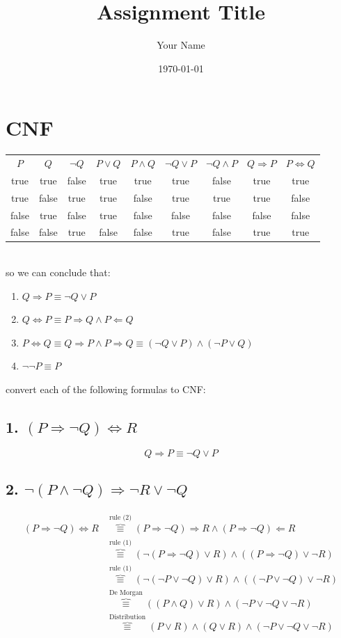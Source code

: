 \documentclass{article}
\title{Assignment Title}
\author{Your Name}
\date{\today}
\begin{document}
\maketitle

\section{CNF}
\begin{tabular}{ccccccccc}
    $P$ & $Q$  & $\neg Q$ & $P \lor Q$ & $P \land Q$ & $\neg Q \lor P$ & $\neg Q \land P$ & $Q \Rightarrow P$ & $P \iff Q$\\
    true&true&false&true&true&true&false&true&true\\
    true&false&true&true&false&true&true&true&false\\
    false&true&false&true&false&false&false&false&false\\
    false&false&true&false&false&true&false&true&true\\
\end{tabular}\\
so we can conclude that:
\begin{enumerate}
    \item $Q \Rightarrow P \equiv \neg Q \lor P$
    \item $Q \iff P \equiv P \Rightarrow Q \land P \Leftarrow Q $
    \item $P \iff Q \equiv Q \Rightarrow P \land P \Rightarrow Q  \equiv (\neg Q \lor P) \land (\neg P \lor Q)$
    \item $\neg \neg P \equiv P$
\end{enumerate}
convert each of the following formulas to CNF:
\subsection{1. $(P \Rightarrow \neg Q) \iff R$}
\begin{equation}
    Q \Rightarrow P \equiv \neg Q \lor P
\end{equation}
\subsection{2. $\neg (P \land \neg Q) \Rightarrow \neg R \lor \neg Q$}
\begin{equation}
    \begin{aligned}
        (P \Rightarrow \neg Q) \iff R &\overbrace{\equiv}^{\text{rule (2)}} (P \Rightarrow \neg Q) \Rightarrow R \land (P \Rightarrow \neg Q) \Leftarrow R\\
        &\overbrace{\equiv}^{\text{rule (1)}} (\neg (P \Rightarrow \neg Q) \lor R ) \land (( P \Rightarrow \neg Q) \lor \neg R)\\
        &\overbrace{\equiv}^{\text{rule (1)}} (\neg (\neg P \lor \neg Q) \lor R ) \land ((\neg P \lor \neg Q) \lor \neg R)\\
        &\overbrace{\equiv}^{\text{De Morgan}} ((  P \land  Q) \lor R) \land (\neg P \lor \neg Q \lor \neg R)\\
        &\overbrace{\equiv}^{\text{Distribution}} ( P \lor R) \land (  Q \lor R) \land  (\neg P \lor \neg Q \lor \neg R)
    \end{aligned}
\end{equation}
\end{document}

